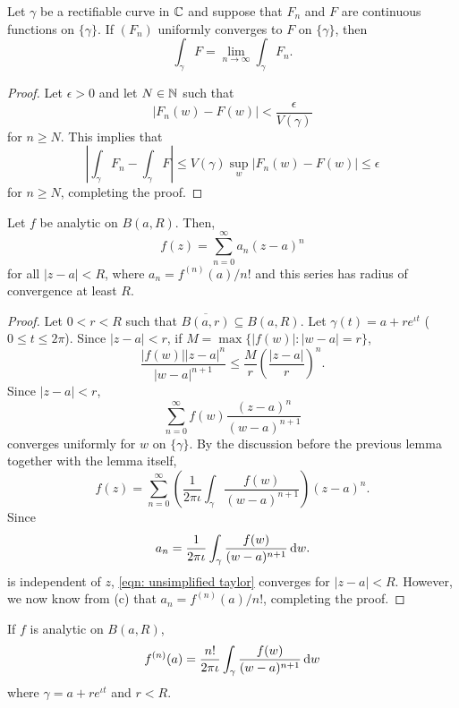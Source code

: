 	\begin{lemma}
		Let $\gamma$ be a rectifiable curve in $\mathbb{C}$ and suppose that $F_n$ and $F$ are continuous functions on $\{\gamma\}$. If $(F_n)$ uniformly converges to $F$ on $\{\gamma\}$, then
		\[ \int_\gamma F = \lim_{n\to\infty} \int_\gamma F_n. \]
	\end{lemma}
	\begin{proof}
		Let $\epsilon > 0$ and let $N \in \mathbb{N}$ such that
		\[ |F_n(w) - F(w)| < \frac{\epsilon}{V(\gamma)} \]
		for $n \ge N$. This implies that
		\[ \left| \int_\gamma F_n - \int_\gamma F \right| \le V(\gamma) \sup_{w} |F_n(w) - F(w)| \le \epsilon \]
		for $n \ge N$, completing the proof.
	\end{proof}

	\begin{ftheo}
		\label{analytic functions have power series}
		Let $f$ be analytic on $B(a,R)$. Then,
		\[ f(z) = \sum_{n=0}^\infty a_n(z-a)^n \]
		for all $|z-a| < R$, where $a_n = f^{(n)}(a)/n!$ and this series has radius of convergence at least $R$.
	\end{ftheo}
	\begin{proof}
		Let $0 < r < R$ such that $\overline{B(a,r)} \subseteq B(a,R)$. Let $\gamma(t) = a + re^{\iota t}$ ($0\le t\le 2\pi$). Since $|z-a| < r$, if $M = \max\{|f(w)| : |w-a| = r\}$,
		\[ \frac{|f(w)||z-a|^n}{|w-a|^{n+1}} \le \frac{M}{r} \left( \frac{|z-a|}{r} \right)^n. \]
		Since $|z-a| < r$,
		\[ \sum_{n=0}^{\infty} f(w) \frac{(z-a)^n}{(w-a)^{n+1}} \]
		converges uniformly for $w$ on $\{\gamma\}$. By the discussion before the previous lemma together with the lemma itself,
		\begin{equation}
			\label{eqn: unsimplified taylor}
			\tag{$*$}
			f(z) = \sum_{n=0}^{\infty} \left(\frac{1}{2\pi\iota} \int_\gamma \frac{f(w)}{(w-a)^{n+1}}\right) (z-a)^n.
		\end{equation}
		Since
		\[ a_n = \frac{1}{2\pi\iota} \int_\gamma \frac{f(w)}{(w-a)^{n+1}} \dif w. \]
		is independent of $z$, \eqref{eqn: unsimplified taylor} converges for $|z-a| < R$. However, we now know from (c) that $a_n = f^{(n)}(a)/n!$, completing the proof.
	\end{proof}

	\begin{corollary}
		If $f$ is analytic on $B(a,R)$,
		\[ f^{(n)}(a) = \frac{n!}{2\pi\iota} \int_\gamma \frac{f(w)}{(w-a)^{n+1}} \dif w \]
		where $\gamma = a + re^{\iota t}$ and $r < R$.
	\end{corollary}

